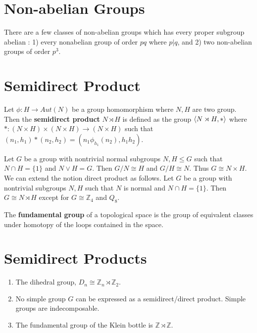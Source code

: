 \section{Non-abelian Groups}
	There are a few classes of non-abelian groups which has every proper subgroup abelian : 
	1) every nonabelian group of order $pq$ where $p|q$, and
	2) two non-abelian groups of order $p^3$.

\section{Semidirect Product}
\begin{definition}
	Let $\phi : H \to Aut(N)$ be a group homomorphism where $N,H$ are two group.
	Then the \textbf{semidirect product} $N \rtimes H$ is defined as the group $\left\langle N \rtimes H,\ast \right\rangle$ where $\ast : (N \times H) \times (N \times H) \to (N \times H)$ such that $(n_1,h_1) \ast (n_2,h_2) = (n_1 \phi_{h_1}(n_2),h_1h_2)$.
\end{definition}

	Let $G$ be a group with nontrivial normal subgroups $N,H \le G$ such that $N \cap H = \{ 1 \}$ and $N \vee H = G$. Then $G/N \cong H$ and $G/H \cong N$. Thus $G \cong N \times H$.\\

	We can extend the notion direct product as follows.
	Let $G$ be a group with nontrivial subgroups $N,H$ such that $N$ is normal and $N \cap H = \{ 1 \}$. Then $G \cong N \rtimes H$ except for $G \cong \mathbb{Z}_4$ and $Q_8$.
	
\begin{definition}
	The \textbf{fundamental group} of a topological space is the group of equivalent classes under homotopy of the loops contained in the space.
\end{definition}

\section{Semidirect Products}
\begin{enumerate}
	\item The dihedral group, $D_n \cong \mathbb{Z}_n \rtimes \mathbb{Z}_2$.
	\item No simple group $G$ can be expressed as a semidirect/direct product.
		\subitem Simple groups are indecomposable.
	\item The fundamental group of the Klein bottle is $\mathbb{Z} \rtimes \mathbb{Z}$.\\
\end{enumerate}


